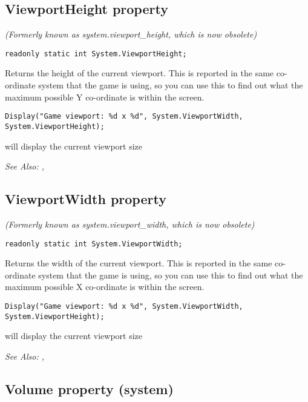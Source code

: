 \subsection{ViewportHeight property}\label{System.ViewportHeight}%

\it{(Formerly known as system.viewport_height, which is now obsolete)}

\begin{verbatim}
readonly static int System.ViewportHeight;
\end{verbatim}
Returns the height of the current viewport. This is reported in the same co-ordinate system
that the game is using, so you can use this to find out what the maximum possible Y co-ordinate
is within the screen.

\begin{verbatim}
Display("Game viewport: %d x %d", System.ViewportWidth, System.ViewportHeight);
\end{verbatim}
will display the current viewport size

\it{See Also:} ,


\subsection{ViewportWidth property}\label{System.ViewportWidth}%

\it{(Formerly known as system.viewport_width, which is now obsolete)}

\begin{verbatim}
readonly static int System.ViewportWidth;
\end{verbatim}
Returns the width of the current viewport. This is reported in the same co-ordinate system
that the game is using, so you can use this to find out what the maximum possible X co-ordinate
is within the screen.

\begin{verbatim}
Display("Game viewport: %d x %d", System.ViewportWidth, System.ViewportHeight);
\end{verbatim}
will display the current viewport size

\it{See Also:} ,


\subsection{Volume property (system)}\label{System.Volume}%

